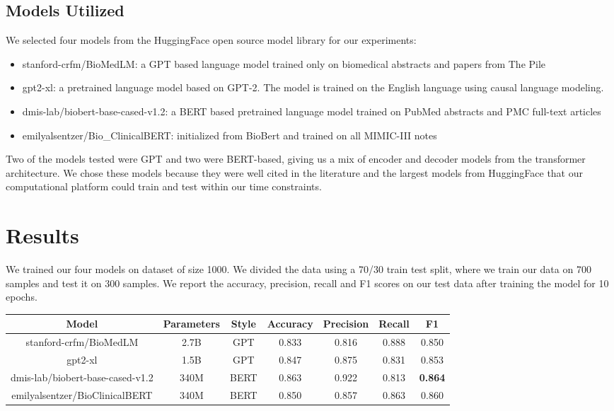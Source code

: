 \documentclass[manuscript,screen,review,nonacm]{acmart}
\begin{document}
\subsection{Models Utilized}
We selected four models from the HuggingFace open source model library for our experiments:
\begin{itemize}
  \item stanford-crfm/BioMedLM: a GPT based language model trained only on biomedical abstracts and papers from The Pile
  \item gpt2-xl: a pretrained language model based on GPT-2. The model is trained on the English language using causal language modeling.
  \item dmis-lab/biobert-base-cased-v1.2: a BERT based pretrained language model trained on PubMed abstracts and PMC full-text articles
  \item emilyalsentzer/Bio\_ClinicalBERT: initialized from BioBert and trained on all MIMIC-III notes
\end{itemize}
Two of the models tested were GPT and two were BERT-based, giving us a mix of encoder and decoder models from the transformer architecture. We chose these models because they were well cited in the literature and the largest models from HuggingFace that our computational platform could train and test within our time constraints. 


\section{Results}

We trained our four models on dataset of size 1000. We divided the data using a 70/30 train test split, where we train our data on 700 samples and test it on 300 samples. We report the accuracy, precision, recall and F1 scores on our test data after training the model for 10 epochs. 

\begin{center}
\begin{tabular}{||c c c c c c c ||} 
 \hline
 Model & Parameters & Style & Accuracy & Precision & Recall & F1 \\ [0.5ex] 
 \hline\hline
 stanford-crfm/BioMedLM & 2.7B & GPT & 0.833 & 0.816 & 0.888 & 0.850
 \\ 
 \hline
 gpt2-xl & 1.5B & GPT & 0.847 & 0.875 & 0.831 & 0.853 \\
 \hline
 dmis-lab/biobert-base-cased-v1.2 & 340M & BERT & 0.863 & 0.922 & 0.813 & \textbf{0.864} \\
 \hline
 emilyalsentzer/BioClinicalBERT & 340M & BERT & 0.850 & 0.857 & 0.863 & 0.860 \\ [1ex] 
 \hline
\end{tabular}
\end{center}
\end{document}

